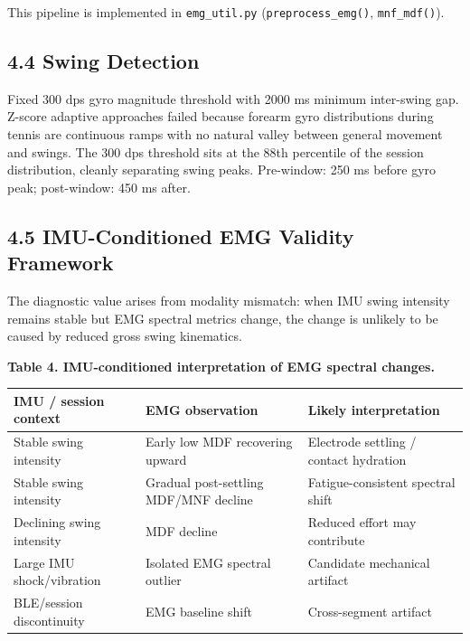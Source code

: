\documentclass[sensors,article,submit,pdftex,moreauthors]{Definitions/mdpi}
\newcounter{none}  %
\begin{document}
This pipeline is implemented in \texttt{emg\_util.py} (\texttt{preprocess\_emg()}, \texttt{mnf\_mdf()}).

\subsection{4.4 Swing Detection}\label{swing-detection}

Fixed 300 dps gyro magnitude threshold with 2000 ms minimum inter-swing gap. Z-score
adaptive approaches failed because forearm gyro distributions during tennis are continuous
ramps with no natural valley between general movement and swings. The 300 dps threshold
sits at the 88th percentile of the session distribution, cleanly separating swing peaks.
Pre-window: 250 ms before gyro peak; post-window: 450 ms after.

\subsection{4.5 IMU-Conditioned EMG Validity Framework}\label{imu-conditioned-emg-validity-framework}

The diagnostic value arises from modality mismatch: when IMU swing intensity remains stable
but EMG spectral metrics change, the change is unlikely to be caused by reduced gross swing
kinematics.

\textbf{Table 4. IMU-conditioned interpretation of EMG spectral changes.}

{\def\LTcaptype{none} %
\begin{longtable}[]{@{}
  >{\raggedright\arraybackslash}p{}
  >{\raggedright\arraybackslash}p{}
  >{\raggedright\arraybackslash}p{}@{}}
\toprule\noalign{}
\begin{minipage}[b]{\linewidth}\raggedright
IMU / session context
\end{minipage} & \begin{minipage}[b]{\linewidth}\raggedright
EMG observation
\end{minipage} & \begin{minipage}[b]{\linewidth}\raggedright
Likely interpretation
\end{minipage} \\
\midrule\noalign{}
\endhead
\bottomrule\noalign{}
\endlastfoot
Stable swing intensity & Early low MDF recovering upward & Electrode settling / contact hydration \\
Stable swing intensity & Gradual post-settling MDF/MNF decline & Fatigue-consistent spectral shift \\
Declining swing intensity & MDF decline & Reduced effort may contribute \\
Large IMU shock/vibration & Isolated EMG spectral outlier & Candidate mechanical artifact \\
BLE/session discontinuity & EMG baseline shift & Cross-segment artifact \\
\end{longtable}
}
\end{document}
